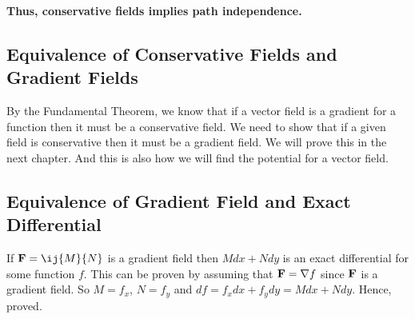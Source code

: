 {\bf Thus, conservative fields implies path independence.}


\subsection{Equivalence of Conservative Fields and Gradient Fields}

By the Fundamental Theorem, we know that if a vector field is a gradient for a function then it must be a conservative field.
We need to show that if a given field is conservative then it must be a gradient field.
We will prove this in the next chapter. 
And this is also how we will find the potential for a vector field.

\subsection{Equivalence of Gradient Field and Exact Differential}

If ${\bf F} = \ij{M}{N}$ is a gradient field then $Mdx + Ndy$ is an exact differential for some function $f$.
This can be proven by assuming that ${\bf F} = \nabla f$ since ${\bf F}$ is a gradient field.
So $M = f_x$, $N = f_y$ and $df = f_x dx + f_y dy = M dx + N dy$. Hence, proved.
